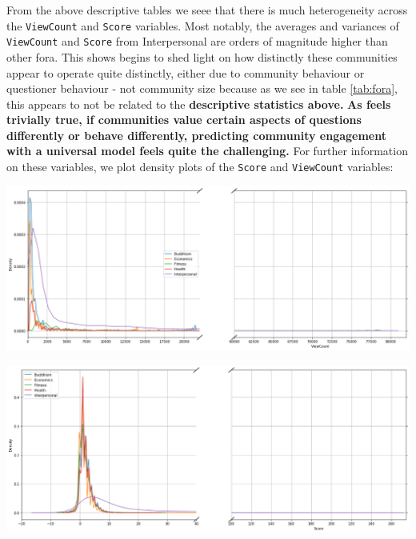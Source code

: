 \documentclass[11pt,preprint, authoryear]{article}
\let\origfigure\figure
\let\endorigfigure\endfigure
\renewenvironment{figure}[1][2] {
    \expandafter\origfigure\expandafter[H]
} {
    \endorigfigure
}
\numberwithin{equation}{section}
\begin{document}
From the above descriptive tables we seee that there is much
heterogeneity across the \texttt{ViewCount} and \texttt{Score}
variables. Most notably, the averages and variances of
\texttt{ViewCount} and \texttt{Score} from Interpersonal are orders of
magnitude higher than other fora. This shows begins to shed light on how
distinctly these communities appear to operate quite distinctly, either
due to community behaviour or questioner behaviour - not community size
because as we see in table \ref{tab:fora}, this appears to not be
related to the \textbf{descriptive statistics above.} \textbf{As feels
trivially true, if communities value certain aspects of questions
differently or behave differently, predicting community engagement with
a universal model feels quite the challenging.} For further information
on these variables, we plot density plots of the \texttt{Score} and
\texttt{ViewCount} variables:

\footnotesize

\begin{figure}
\caption{\textbf{Density Plots}}
\label{fig:density}

\begin{center}\includegraphics[width=0.8\linewidth]{../../01-python-code/00-workspace/01-eda/01-graphs/viewcount-density-plot} \end{center}



\begin{center}\includegraphics[width=0.8\linewidth]{../../01-python-code/00-workspace/01-eda/01-graphs/score-density-plot} \end{center}
\end{figure}
\end{document}
